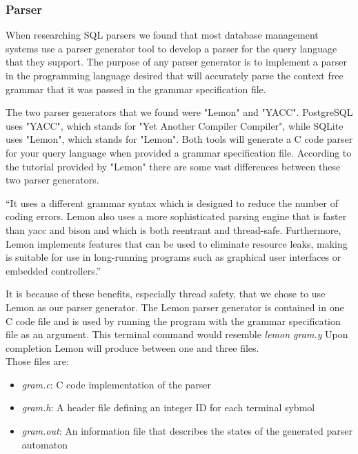 \documentclass[letterpaper]{article}
\begin{document}
\subsubsection{Parser}
When researching SQL parsers we found that most database management systems use a
parser generator tool to develop a parser for the query language that they support.
The purpose of any parser generator is to implement a parser in the programming
language desired that will accurately parse the context free grammar that it 
was passed in the grammar specification file.
\par\vspace{\baselineskip}
The two parser generators that we found were "Lemon" and "YACC". PostgreSQL uses 
"YACC", which stands for "Yet Another Compiler Compiler", while SQLite uses 
"Lemon", which stands for "Lemon". Both tools will generate a C code parser for 
your query language when provided a grammar specification file. According to the 
tutorial provided by "Lemon" there are some vast differences between these 
two parser generators. 
\par\vspace{\baselineskip}
“It uses a different grammar syntax which is designed to reduce the number of coding
errors. Lemon also uses a more sophisticated parsing engine that is faster than yacc and
bison and which is both reentrant and thread-safe. Furthermore, Lemon implements features
that can be used to eliminate resource leaks, making is suitable for use in long-running
programs such as graphical user interfaces or embedded controllers.”\cite{lemon_parser}
\par\vspace{\baselineskip}
It is because of these benefits, especially thread safety, that we chose to use Lemon
as our parser generator. The Lemon parser generator is contained in one C code file and
is used by running the program with the grammar specification file as an argument.
This terminal command would resemble \textit{lemon gram.y} 
Upon completion Lemon will produce between one and three files.\\ Those files are:
\begin{itemize}
	\item \textit{gram.c}: C code implementation of the parser
	\item \textit{gram.h}: A header file defining an integer ID for each terminal sybmol
	\item \textit{gram.out}: An information file that describes the states of the
	generated parser automaton
\end{itemize}
\end{document}
